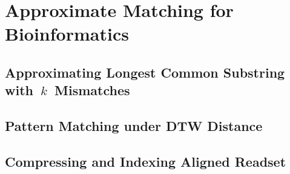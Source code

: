 \part{Approximate Matching for Bioinformatics}\label{part:approx-bio}

\mainmatter
\chapter{Approximating Longest Common Substring with~\texorpdfstring{$k$}{k}~Mismatches}\label{chap:LCS}%

\mainmatter
\chapter{Pattern Matching under DTW Distance}\label{chap:DTW}

\mainmatter
\chapter{Compressing and Indexing Aligned Readset}\label{chap:XBWT}

